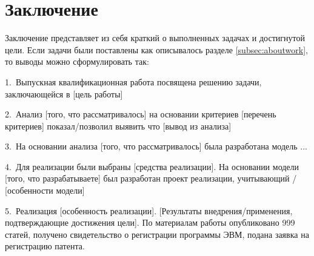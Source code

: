 {}

\section*{Заключение}

Заключение представляет из себя краткий о выполненных задачах и достигнутой цели. Если задачи были поставлены как описывалось разделе \ref{subsec:aboutwork}, то выводы можно сформулировать так:

1.\mbox{ }Выпускная квалификационная работа посвящена решению задачи, заключающейся в [цель работы]

2.\mbox{ }Анализ [того, что рассматривалось] на основании критериев [перечень критериев] показал/позволил выявить что [вывод из анализа]

3.\mbox{ }На основании анализа [того, что рассматривалось] была разработана модель ...

4.\mbox{ }Для реализации были выбраны [средства реализации]. На основании модели [того, что разрабатываете] был разработан проект реализации, учитывающий / [особенности модели]
	
5.\mbox{ }Реализация [особенность реализации]. [Результаты внедрения/применения, подтверждающие достижения цели]. По материалам работы опубликовано 999 статей, получено свидетельство о регистрации программы ЭВМ, подана заявка на регистрацию патента.
	
